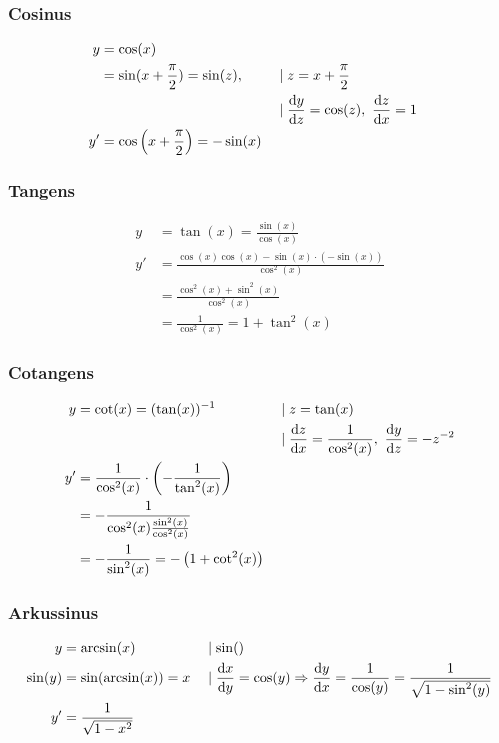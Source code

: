 \subsubsection{Cosinus}

\begin{align*}
    y &= \cos(x) \\
    &= \sin(x + \frac{\pi}{2}) = \sin(z), &&\mid z = x + \frac{\pi}{2} \\
    & &&\mid \frac{\mathop{}\!\mathrm{d} y}{\mathop{}\!\mathrm{d} z} = \cos(z),\ \frac{\mathop{}\!\mathrm{d} z}{\mathop{}\!\mathrm{d} x} = 1 \\
    y' &= \cos\left(x + \frac{\pi}{2}\right) = -\sin(x) 
\end{align*}

\subsubsection{Tangens}

\begin{align*}
    y &= \tan(x) = \frac{\sin(x)}{\cos(x)} \\
    y' &= \frac{\cos(x)\cos(x) - \sin(x)\cdot (-\sin(x))}{\cos^2(x)} \\
    &= \frac{\cos^2(x) + \sin^2(x)}{\cos^2(x)} \\
    &= \frac{1}{\cos^2(x)} = 1 + \tan^2(x)
\end{align*}

\subsubsection{Cotangens}

\begin{align*}
    y &= \cot(x) = (\tan(x))^{-1} &&\mid z = \tan(x) \\
    & &&\mid \frac{\diff z}{\diff x} = \frac{1}{\cos^2(x)},\ \frac{\diff y}{\diff z} = -z^{-2} \\
    y' &= \frac{1}{\cos^2(x)} \cdot \left( -\frac{1}{\tan^2(x)} \right) \\
    &= -\frac{1}{\cos^2(x) \frac{\sin^2(x)}{\cos^2(x)}} \\
    &= -\frac{1}{\sin^2(x)} = -\left( 1 + \cot^2(x) \right)
\end{align*}

\subsubsection{Arkussinus}

\begin{align*}
    y &= \arcsin(x) &&\mid \sin() \\
    \sin(y) &= \sin(\arcsin(x)) = x &&\mid \frac{\mathop{}\!\mathrm{d} x}{\mathop{}\!\mathrm{d} y} = \cos(y) \Rightarrow \frac{\mathop{}\!\mathrm{d} y}{\mathop{}\!\mathrm{d} x} = \frac{1}{\cos(y)} = \frac{1}{\sqrt{1 - \sin^2(y)}} \\
    y' &= \frac{1}{\sqrt{1 - x^2}}
\end{align*}

